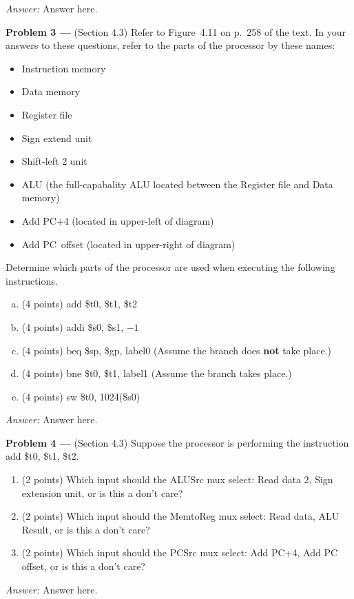 \documentclass[11pt]{article}
\newcommand{\problem}[1]{\textbf{Problem #1 ---} }
\newcommand{\answer}{{\color{red}\textit{Answer: }}}
\begin{document}
\answer
Answer here.

\problem{3}(Section 4.3) Refer to Figure~4.11 on p.~258 of the text.  In your answers to these questions, refer to the parts of the processor by these names:
\begin{itemize}
    \item Instruction memory
    \item Data memory
    \item Register file
    \item Sign extend unit
    \item Shift-left 2 unit
    \item ALU (the full-capabality ALU  located between the Register file and Data memory)
    \item Add PC$+$4 (located in upper-left of diagram)
    \item Add PC~offset (located in upper-right of diagram)
\end{itemize}
Determine which parts of the processor are used when executing the following instructions.
\begin{enumerate}[(a)]
    \item(4 points) \textsf{add \$t0, \$t1, \$t2}
    \item(4 points) \textsf{addi \$s0, \$s1, $-1$}
    \item(4 points) \textsf{beq \$sp, \$gp, label0} (Assume the branch does \textbf{not} take place.)
    \item(4 points) \textsf{bne \$t0, \$t1, label1} (Assume the branch takes place.)
    \item(4 points) \textsf{sw \$t0, 1024(\$s0)}
\end{enumerate}

\answer
Answer here.

\problem{4}(Section 4.3) Suppose the processor is performing the instruction \textsf{add \$t0, \$t1, \$t2}.
\begin{enumerate}
    \item(2 points) Which input should the \textsf{ALUSrc} mux select: Read data 2, Sign extension unit, or is this a don't care?
    \item(2 points) Which input should the \textsf{MemtoReg} mux select:  Read data, ALU Result, or is this a don't care?
    \item(2 points) Which input should the \textsf{PCSrc} mux select: Add PC+4, Add PC offset, or is this a don't care?
\end{enumerate}

\answer
Answer here.
\end{document}
